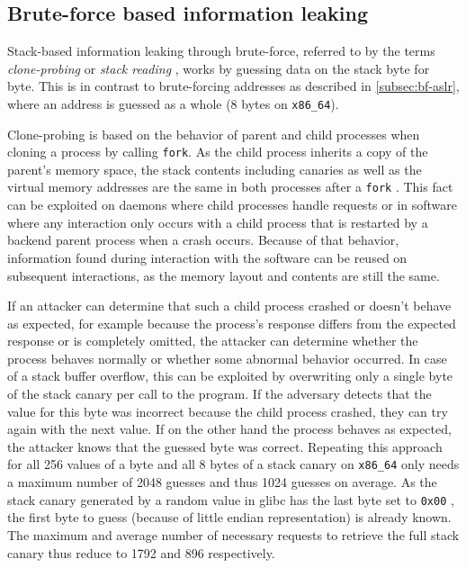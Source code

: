 \subsection{Brute-force based information leaking}
\label{subsec:bf-information-leaking}

Stack-based information leaking through brute-force, referred to by the terms \emph{clone-probing} \cite{Lu2016} or \emph{stack reading} \cite{Bittau2014}, works by guessing data on the stack byte for byte.
This is in contrast to brute-forcing addresses as described in \cref{subsec:bf-aslr}, where an address is guessed as a whole (8 bytes on \texttt{x86\_64}).

Clone-probing is based on the behavior of parent and child processes when cloning a process by calling \texttt{fork}.
As the child process inherits a copy of the parent's memory space, the stack contents including canaries as well as the virtual memory addresses are the same in both processes after a \texttt{fork} \cites[230]{Bittau2014}[1\psq]{Lu2016}{Kerrisk2020d}.
This fact can be exploited on daemons where child processes handle requests or in software where any interaction only occurs with a child process that is restarted by a backend parent process when a crash occurs.
Because of that behavior, information found during interaction with the software can be reused on subsequent interactions, as the memory layout and contents are still the same.

If an attacker can determine that such a child process crashed or doesn't behave as expected, for example because the process's response differs from the expected response or is completely omitted, the attacker can determine whether the process behaves normally or whether some abnormal behavior occurred.
In case of a stack buffer overflow, this can be exploited by overwriting only a single byte of the stack canary per call to the program.
If the adversary detects that the value for this byte was incorrect because the child process crashed, they can try again with the next value.
If on the other hand the process behaves as expected, the attacker knows that the guessed byte was correct.
Repeating this approach for all 256 values of a byte and all 8 bytes of a stack canary on \texttt{x86\_64} only needs a maximum number of 2048 guesses and thus 1024 guesses on average.
As the stack canary generated by a random value in \gls{glibc} has the last byte set to \texttt{0x00} \cite[\texttt{sysdeps/generic/dl-osinfo.h}]{FSF2020a}, the first byte to guess (because of little endian representation) is already known.
The maximum and average number of necessary requests to retrieve the full stack canary thus reduce to 1792 and 896 respectively.

